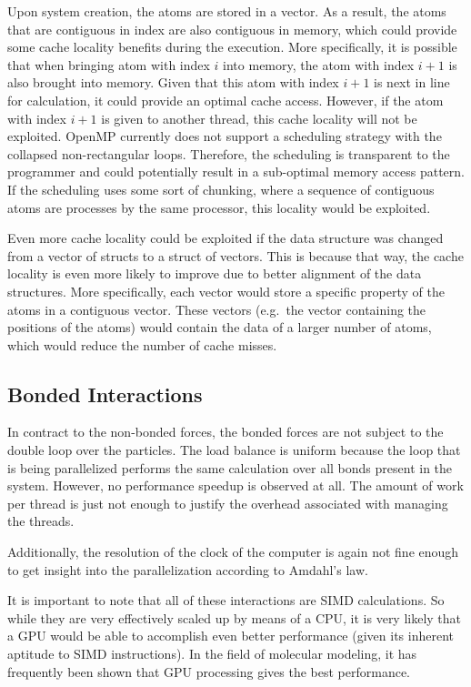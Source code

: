 \documentclass[conference]{IEEEtran}
\begin{document}
Upon system creation, the atoms are stored in a vector. As a result, the atoms that are contiguous in index are also 
contiguous in memory, which could provide some
cache locality benefits during the execution. More specifically, it is possible that when bringing atom with index
$i$ into memory, the atom with index $i+1$ is also brought into memory. Given that this atom with index $i+1$ is next
in line for calculation, it could provide an optimal cache access. However, if the atom with index $i+1$ is given to
another thread, this cache locality will not be exploited. OpenMP currently does not support a scheduling
strategy with the collapsed non-rectangular loops. Therefore, the scheduling is transparent to the programmer
and could potentially result in a sub-optimal memory access pattern. If the scheduling uses some sort of chunking, where
a sequence of contiguous atoms are processes by the same processor, this locality would be exploited.

Even more cache locality could be exploited if the data structure was changed from a vector of structs to a struct 
of vectors. This is because that way, the cache locality is even more likely to improve due to better alignment of
the data structures. More specifically, each vector would store a specific property of the atoms in a contiguous vector.
These vectors (e.g.\ the vector containing the positions of the atoms) would contain the data of a larger number of
atoms, which would reduce the number of cache misses.

\subsection{Bonded Interactions}
In contract to the non-bonded forces, the bonded forces are not subject to the double loop over the particles.
The load balance is 
uniform because the loop that is being parallelized performs the same calculation over all bonds present in the
system.
However,
no performance speedup is observed at all. The amount of work per thread is just not enough to justify the overhead
associated with managing the threads.

Additionally, the resolution of the clock of the computer is again not fine enough to get insight into the parallelization
according to Amdahl's law.


It is important to note that all of these
interactions are SIMD calculations. So while they are very effectively scaled up by means of a CPU, it is very likely
that a GPU would be able to accomplish even better performance (given its inherent aptitude to SIMD instructions). 
In the field of molecular modeling, it has frequently been shown that GPU processing gives the best 
performance.~\cite{eastman2010openmm,friedrichs2009accelerating}
\end{document}

